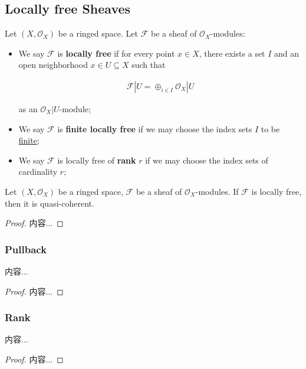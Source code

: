 \documentclass[Total.tex]{subfiles}
\begin{document}
			\subsection{Locally free Sheaves}
			
				\begin{Def}
					Let $(X,\mathcal{O}_X)$ be a ringed space. Let $\mathcal{F}$ be a sheaf of $\mathcal{O}_X$-modules:
					
					\begin{itemize}
						\item We say $\mathcal{F}$ is \textbf{locally free} if for every point $x\in X$, there exists a set $I$ and an open neighborhood $x\in U\subseteq X$ such that
						
						\begin{gather*}
							\mathcal{F}|U=\oplus_{i\in I} \mathcal{O}_X|U
						\end{gather*}
						
						as an $\mathcal{O}_X|U$-module;
						
						\item We say $\mathcal{F}$ is \textbf{finite locally free} if we may choose the index sets $I$ to be \underline{finite};
						\item We say $\mathcal{F}$ is locally free of \textbf{rank} $r$ if we may choose the index sets of cardinality $r$;
					\end{itemize}
				\end{Def}
				
				\begin{lemma}
					Let $(X,\mathcal{O}_X)$ be a ringed space, $\mathcal{F}$ be a sheaf of $\mathcal{O}_X$-modules. If $\mathcal{F}$ is locally free, then it is quasi-coherent.
				\end{lemma}
				\begin{proof}
					内容...
				\end{proof}
				
				\subsubsection{Pullback}
				\begin{lemma}
					内容...
				\end{lemma}
				\begin{proof}
					内容...
				\end{proof}
				\subsubsection{Rank}
				\begin{lemma}
					内容...
				\end{lemma}
				\begin{proof}
					内容...
				\end{proof}
				
\end{document}
